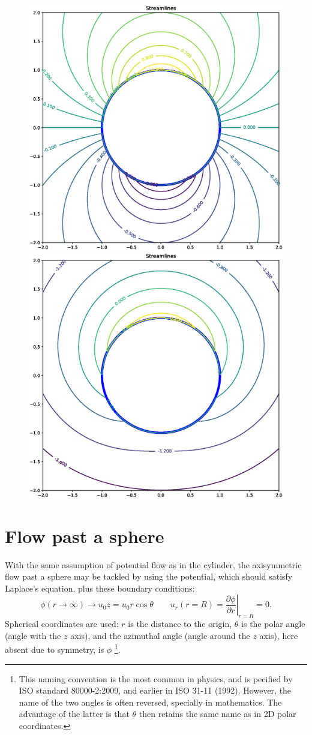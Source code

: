 \begin{figure}
  \centering
  \includegraphics[width=0.4\linewidth]{figures/potential_flow_past_cylinder_moving}
  \includegraphics[width=0.4\linewidth]{figures/potential_flow_past_cylinder_rotating_moving}
  \caption{\label{fig:potential_flow_past_cylinder_moving}}
\end{figure}


\section{Flow past a sphere}

With the same assumption of potential flow as in the cylinder, the
axisymmetric flow past a sphere may be tackled by using the potential,
which should satisfy Laplace's equation, plus these boundary
conditions:
\[
  \phi (r\to \infty) \to u_0 z = u_0 r \cos\theta \qquad
  u_r(r=R) =\left. \frac{\partial \phi}{\partial r} \right|_{r=R} = 0 .
\]
Spherical coordinates  are used:
$r$ is the distance to the origin, $\theta$ is the polar angle (angle
with the $z$ axis), and the azimuthal angle (angle around the $z$
axis), here absent due to symmetry, is $\phi$ %
\footnote{This naming convention is the most common in physics, and is
  pecified by ISO standard 80000-2:2009, and earlier in ISO 31-11
  (1992). However, the name of the two angles is often reversed,
  specially in mathematics. The advantage of the latter is that
  $\theta$ then retains the same name as in 2D polar coordinates.}.


